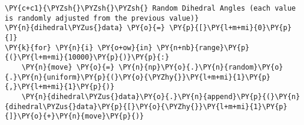     \begin{tcolorbox}[breakable, size=fbox, boxrule=1pt, pad at break*=1mm,colback=cellbackground, colframe=cellborder]
\begin{Verbatim}[commandchars=\\\{\}]
\PY{c+c1}{\PYZsh{}\PYZsh{}\PYZsh{} Random Dihedral Angles (each value is randomly adjusted from the previous value)}
\PY{n}{dihedral\PYZus{}data} \PY{o}{=} \PY{p}{[}\PY{l+m+mi}{0}\PY{p}{]}
\PY{k}{for} \PY{n}{i} \PY{o+ow}{in} \PY{n+nb}{range}\PY{p}{(}\PY{l+m+mi}{10000}\PY{p}{)}\PY{p}{:}
    \PY{n}{move} \PY{o}{=} \PY{n}{np}\PY{o}{.}\PY{n}{random}\PY{o}{.}\PY{n}{uniform}\PY{p}{(}\PY{o}{\PYZhy{}}\PY{l+m+mi}{1}\PY{p}{,}\PY{l+m+mi}{1}\PY{p}{)}
    \PY{n}{dihedral\PYZus{}data}\PY{o}{.}\PY{n}{append}\PY{p}{(}\PY{n}{dihedral\PYZus{}data}\PY{p}{[}\PY{o}{\PYZhy{}}\PY{l+m+mi}{1}\PY{p}{]}\PY{o}{+}\PY{n}{move}\PY{p}{)}
\end{Verbatim}
\end{tcolorbox}

